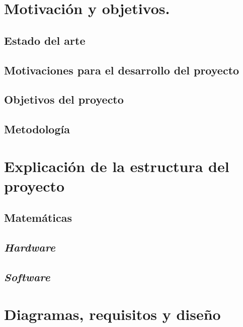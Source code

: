 \chapter{Motivación y objetivos.}
\section{Estado del arte}
\section{Motivaciones para el desarrollo del proyecto}
\section{Objetivos del proyecto}
\section{Metodología}
\chapter{Explicación de la estructura del proyecto}
\section{Matemáticas}
\section{\textit{Hardware}}
\section{\textit{Software}}
\chapter{Diagramas, requisitos y diseño}
